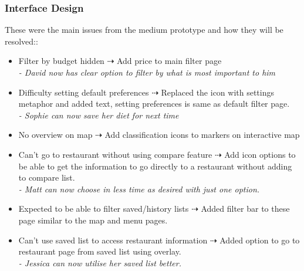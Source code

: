 \documentclass[a4 paper, 12pt]{article}
\begin{document}
    \subsubsection{Interface Design}
    These were the main issues from the medium prototype and how they will be resolved::
    \begin{itemize}
        \item Filter by budget hidden $\dashrightarrow$ Add price to main filter page \\
        \textit{- David now has clear option to filter by what is most important to him}
        \item Difficulty setting default preferences $\dashrightarrow$ Replaced the icon with settings metaphor and added text, setting preferences is same as default filter page. \\
        \textit{- Sophie can now save her diet for next time}
        \item No overview on map  $\dashrightarrow$ Add classification icons to markers on interactive map            
        \item Can't go to restaurant without using compare feature $\dashrightarrow$ Add icon options to be able to get the information to go directly to a restaurant without adding to compare list. \\
        \textit{- Matt can now choose in less time as desired with just one option.}
        \item Expected to be able to filter saved/history lists $\dashrightarrow$ Added filter bar to these page similar to the map and menu pages. 
        \item Can't use saved list to access restaurant information $\dashrightarrow$ Added option to go to restaurant page from saved list using overlay.  \\
        \textit{- Jessica can now utilise her saved list better.}
    \end{itemize}
\end{document}
